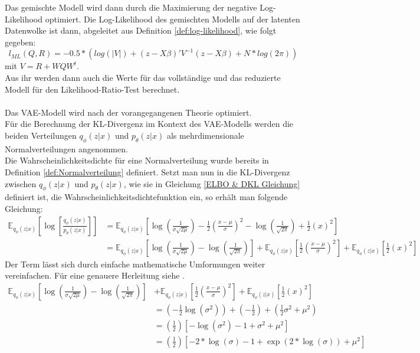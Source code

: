 \documentclass[%
thesis=student,%
coverpage=false,%
titlepage=false,%
headmarks=true, %
german,%
font=libertine, %
math=newpxtx, %
BCOR=5mm,%
coverBCOR=11mm%
]{tumbook}
\theoremstyle{break}
\begin{document}
Das gemischte Modell wird dann durch die Maximierung der negative Log-Likelihood optimiert. Die Log-Likelihood des gemischten Modells auf der latenten Datenwolke ist dann, abgeleitet aus Definition \ref{def:log-likelihood}, wie folgt gegeben:
$$ l_{ML}(Q,R) = -0.5 * (log(|V|)+ (z-X\beta)'V^{-1}(z-X\beta) + N * log(2\pi))$$
mit $V= R + WQW^t$.\\
Aus ihr werden dann auch die Werte für das vollständige und das reduzierte Modell für den Likelihood-Ratio-Test berechnet.\\
\\
Das VAE-Modell wird nach der vorangegangenen Theorie optimiert. \\
Für die Berechnung der KL-Divergenz im Kontext des VAE-Modells werden die beiden Verteilungen $q_\phi(z|x)$ und $p_\theta(z|x)$ als mehrdimensionale Normalverteilungen angenommen. \\
Die Wahrscheinlichkeitsdichte für eine Normalverteilung wurde bereits in Definition \ref{def:Normalverteilung} definiert. Setzt man nun in die KL-Divergenz zwischen $q_\phi(z|x)$ und $p_\theta(z|x)$, wie sie in Gleichung \ref{ELBO & DKL Gleichung} definiert ist, die Wahrscheinlichkeitsdichtefunktion ein, so erhält man folgende Gleichung:
\begin{align}
	\mathbb{E}_{q_\phi(z|x)}\left[\log\left[ \frac{q_\phi(z|x)}{p_\theta(z|x)}\right]\right] &=\mathbb{E}_{q_\phi(z|x)}\left[\log\left(\frac{1}{\sigma\sqrt{2\mu}}\right)- \frac{1}{2}\left(\frac{x-\mu}{\sigma}\right)^2 - \log\left(\frac{1}{\sqrt{2\pi}}\right)+ \frac{1}{2}(x)^2\right] \\
	&=\mathbb{E}_{q_\phi(z|x)}\left[\log\left(\frac{1}{\sigma\sqrt{2\mu}}\right) - \log\left(\frac{1}{\sqrt{2\pi}}\right)\right] + \mathbb{E}_{q_\phi(z|x)}\left[ \frac{1}{2}\left(\frac{x-\mu}{\sigma}\right)^2\right] + \mathbb{E}_{q_\phi(z|x)}\left[\frac{1}{2}(x)^2\right] 
\end{align}
Der Term lässt sich durch einfache mathematische Umformungen weiter vereinfachen. Für eine genauere Herleitung siehe \cite{KL-Div}.
\begin{align}
	\mathbb{E}_{q_\phi(z|x)}\left[\log\left(\frac{1}{\sigma\sqrt{2\mu}}\right) - \log\left(\frac{1}{\sqrt{2\pi}}\right)\right] &+ \mathbb{E}_{q_\phi(z|x)}\left[ \frac{1}{2}\left(\frac{x-\mu}{\sigma}\right)^2\right] + \mathbb{E}_{q_\phi(z|x)}\left[\frac{1}{2}(x)^2\right] \\
	&= (-\frac{1}{2}\log(\sigma^2)) + (-\frac{1}{2}) + (\frac{1}{2}\sigma^2 + \mu^2) \\
	&= (\frac{1}{2})[-\log(\sigma^2)-1+\sigma^2+\mu^2] \\
	&= (\frac{1}{2})[-2*\log(\sigma)-1+ \exp(2* \log(\sigma))+\mu^2]
\end{align}
\end{document}
